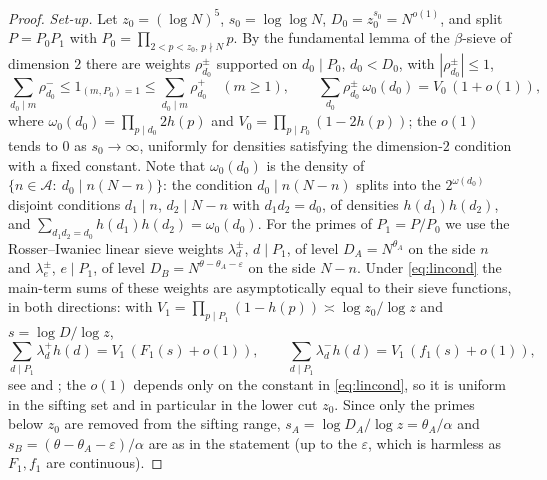 \documentclass[11pt]{amsart}
\theoremstyle{remark}
\newcommand{\cA}{\mathcal{A}}
\newcommand{\e}{\varepsilon}
\begin{document}
\begin{proof}
\emph{Set-up.} Let $z_0=(\log N)^5$, $s_0=\log\log N$, $D_0=z_0^{s_0}=N^{o(1)}$, and split $P=P_0P_1$ with $P_0=\prod_{2<p<z_0,\,p\nmid N}p$. By the fundamental lemma of the $\beta$-sieve of dimension $2$ \cite[Chapter~6]{FI} there are weights $\rho^\pm_{d_0}$ supported on $d_0\mid P_0$, $d_0<D_0$, with $|\rho^\pm_{d_0}|\le1$,
\[
\sum_{d_0\mid m}\rho^-_{d_0}\le1_{(m,P_0)=1}\le\sum_{d_0\mid m}\rho^+_{d_0}\quad(m\ge1),\qquad
\sum_{d_0}\rho^\pm_{d_0}\,\omega_0(d_0)=V_0\,(1+o(1)),
\]
where $\omega_0(d_0)=\prod_{p\mid d_0}2h(p)$ and $V_0=\prod_{p\mid P_0}(1-2h(p))$; the $o(1)$ tends to $0$ as $s_0\to\infty$, uniformly for densities satisfying the dimension-$2$ condition with a fixed constant. Note that $\omega_0(d_0)$ is the density of $\{n\in\cA:\ d_0\mid n(N-n)\}$: the condition $d_0\mid n(N-n)$ splits into the $2^{\omega(d_0)}$ disjoint conditions $d_1\mid n$, $d_2\mid N-n$ with $d_1d_2=d_0$, of densities $h(d_1)h(d_2)$, and $\sum_{d_1d_2=d_0}h(d_1)h(d_2)=\omega_0(d_0)$. For the primes of $P_1=P/P_0$ we use the Rosser--Iwaniec linear sieve weights \cite{IwaniecRosser} $\lambda^\pm_d$, $d\mid P_1$, of level $D_A=N^{\theta_A}$ on the side $n$ and $\lambda^\pm_e$, $e\mid P_1$, of level $D_B=N^{\theta-\theta_A-\e}$ on the side $N-n$. Under \eqref{eq:lincond} the main-term sums of these weights are asymptotically equal to their sieve functions, in both directions: with $V_1=\prod_{p\mid P_1}(1-h(p))\asymp\log z_0/\log z$ and $s=\log D/\log z$,
\begin{equation}\label{eq:rosser}
\sum_{d\mid P_1}\lambda^+_dh(d)=V_1\,(F_1(s)+o(1)),\qquad \sum_{d\mid P_1}\lambda^-_dh(d)=V_1\,(f_1(s)+o(1)),
\end{equation}
see \cite[Section~3]{BF} and \cite{IwaniecRosser}; the $o(1)$ depends only on the constant in \eqref{eq:lincond}, so it is uniform in the sifting set and in particular in the lower cut $z_0$. Since only the primes below $z_0$ are removed from the sifting range, $s_A=\log D_A/\log z=\theta_A/\alpha$ and $s_B=(\theta-\theta_A-\e)/\alpha$ are as in the statement (up to the $\e$, which is harmless as $F_1,f_1$ are continuous).


\end{proof}
\end{document}
